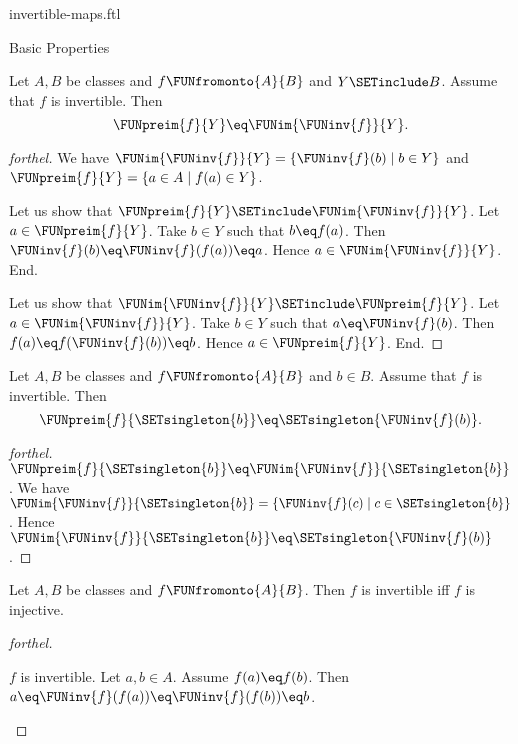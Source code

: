 \documentclass{naproche-library}
\begin{document}
\begin{smodule}[title=Invertible Maps]{invertible-maps.ftl}
\begin{sfragment}{Basic Properties}
  \begin{proposition}[forthel,id=FOUNDATIONS_09_7726021377785856]
    Let $A, B$ be classes and $f \FUNfromonto{A}{B}$ and $Y \SETinclude B$.
    Assume that $f$ is invertible.
    Then \[ \FUNpreim{f}{Y} \eq \FUNim{\FUNinv{f}}{Y}. \]
  \end{proposition}
  \begin{proof}[forthel]
    We have $\FUNim{\FUNinv{f}}{Y} = \{ \FUNinv{f}(b) \mid b \in Y \}$ and $\FUNpreim{f}{Y} = \{ a \in A \mid f(a) \in Y \}$.

    Let us show that $\FUNpreim{f}{Y} \SETinclude \FUNim{\FUNinv{f}}{Y}$.
      Let $a \in \FUNpreim{f}{Y}$.
      Take $b \in Y$ such that $b \eq f(a)$.
      Then $\FUNinv{f}(b) \eq \FUNinv{f}(f(a)) \eq a$.
      Hence $a \in \FUNim{\FUNinv{f}}{Y}$.
    End.

    Let us show that $\FUNim{\FUNinv{f}}{Y} \SETinclude \FUNpreim{f}{Y}$.
      Let $a \in \FUNim{\FUNinv{f}}{Y}$.
      Take $b \in Y$ such that $a \eq \FUNinv{f}(b)$.
      Then $f(a) \eq f(\FUNinv{f}(b)) \eq b$.
      Hence $a \in \FUNpreim{f}{Y}$.
    End.
  \end{proof}

  \begin{corollary}[forthel,id=FOUNDATIONS_09_8607784268464128]
    Let $A, B$ be classes and $f \FUNfromonto{A}{B}$ and $b \in B$.
    Assume that $f$ is invertible.
    Then \[ \FUNpreim{f}{\SETsingleton{b}} \eq \SETsingleton{\FUNinv{f}(b)}. \]
  \end{corollary}
  \begin{proof}[forthel]
    $\FUNpreim{f}{\SETsingleton{b}} \eq \FUNim{\FUNinv{f}}{\SETsingleton{b}}$.
    We have $\FUNim{\FUNinv{f}}{\SETsingleton{b}} = \{ \FUNinv{f}(c) \mid c \in \SETsingleton{b} \}$.
    Hence $\FUNim{\FUNinv{f}}{\SETsingleton{b}} \eq \SETsingleton{\FUNinv{f}(b)}$.
  \end{proof}

  \begin{proposition}[forthel,id=FOUNDATIONS_09_6777575974109184]
    Let $A, B$ be classes and $f \FUNfromonto{A}{B}$.
    Then $f$ is invertible iff $f$ is injective.
  \end{proposition}
  \begin{proof}[forthel]
    \begin{case}{$f$ is invertible.}
      Let $a, b \in A$.
      Assume $f(a) \eq f(b)$.
      Then $a \eq \FUNinv{f}(f(a)) \eq \FUNinv{f}(f(b)) \eq b$.
    \end{case}


\end{proof}
\end{sfragment}
\end{smodule}
\end{document}
